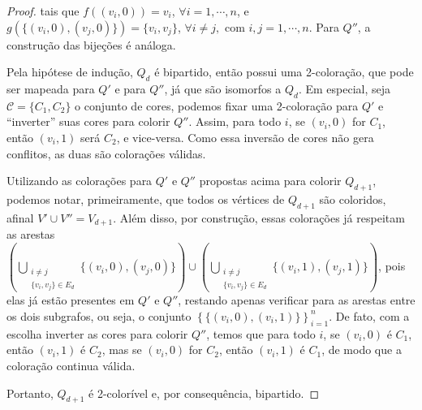 \documentclass[12pt, a4paper]{article}
\begin{document}
\begin{proof}
    \noindent tais que $f((v_i, 0)) = v_i$, $\forall i = 1, \cdots, n$, e $g(\{(v_i, 0),(v_j, 0)\}) = \{v_i,v_j\}$, $\forall i\neq j,\text{ com }i,j = 1, \cdots, n$. Para $Q''$, a construção das bijeções é análoga.

    Pela hipótese de indução, $Q_d$ é bipartido, então possui uma 2-coloração, que pode ser mapeada para $Q'$ e para $Q''$, já que são isomorfos a $Q_d$. Em especial, seja $\mathcal{C} =\{C_1, C_2\}$ o conjunto de cores, podemos fixar uma 2-coloração para $Q'$ e ``inverter'' suas cores para colorir $Q''$. Assim, para todo $i$, se $(v_i, 0)$ for $C_1$, então $(v_i, 1)$ será $C_2$, e vice-versa. Como essa inversão de cores não gera conflitos, as duas são colorações válidas. 

    Utilizando as colorações para $Q'$ e $Q''$ propostas acima para colorir $Q_{d+1}$, podemos notar, primeiramente, que todos os vértices de $Q_{d+1}$ são coloridos, afinal $V' \cup V'' = V_{d+1}$. Além disso, por construção, essas colorações já respeitam as arestas $\left(\bigcup_{\substack{i\neq j \\ \{v_i, v_j\}\in E_d}} \{(v_i, 0), (v_j, 0)\}\right)\cup \left(\bigcup_{\substack{i\neq j \\ \{v_i, v_j\}\in E_d}} \{(v_i, 1), (v_j, 1)\}\right)$, pois elas já estão presentes em $Q'$ e $Q''$, restando apenas verificar para as arestas entre os dois subgrafos, ou seja, o conjunto $\left\{\{(v_i, 0), (v_i, 1)\}\right\}_{i=1}^{n}$. De fato, com a escolha inverter as cores para colorir $Q''$, temos que para todo $i$, se $(v_i, 0)$ é $C_1$, então $(v_i, 1)$ é $C_2$, mas se $(v_i, 0)$ for $C_2$, então $(v_i, 1)$ é $C_1$, de modo que a coloração continua válida.

    Portanto, $Q_{d+1}$ é 2-colorível e, por consequência, bipartido.
\end{proof}
\end{document}
